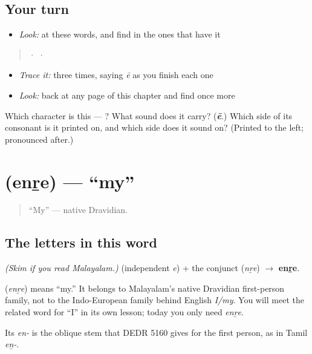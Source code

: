 \subsection*{Your turn}
\begin{itemize}
\raggedright
  \item \emph{Look:} at these words, and find  in the ones that have it
\end{itemize}

\begin{quote}
  ·    ·  
\end{quote}

\begin{itemize}
\raggedright
  \item \emph{Trace it:}  three times, saying \emph{ē} as you finish each one
  \item \emph{Look:} back at any page of this chapter and find  once more
\end{itemize}

\begin{tcolorbox}[breakable,colback=teal!4,colframe=teal!35!black,title={Before you move on}]
Which character is this — ? What sound does it carry? (\emph{\textbf{ē}}.) Which side of its consonant is it printed on, and which side does it sound on? (Printed to the left; pronounced after.)
\end{tcolorbox}
\section[\texorpdfstring{\ml{എന്റെ} (enṟe)}{എന്റെ (enṟe)}]{ (enṟe) — \textquotedblleft{}my\textquotedblright{}}

\label{lesson:ML-C02-enre}



\begin{quote}
\textquotedblleft{}My\textquotedblright{} — native Dravidian.
\end{quote}

\subsection*{The letters in this word}
\emph{(Skim if you read Malayalam.)} \textbf{} (independent \emph{e}) + the conjunct \textbf{} (\emph{nṟe}) $\to$ \textbf{enṟe}.

\begin{cousinweb}
\textbf{} (\emph{enṟe}) means \textquotedblleft{}my.\textquotedblright{} It belongs to Malayalam's native Dravidian first-person family, not to the Indo-European family behind English \emph{I/my}. You will meet the related word for \textquotedblleft{}I\textquotedblright{} in its own lesson; today you only need \emph{enṟe}.

Its \emph{en-} is the oblique stem that DEDR 5160 gives for the first person, as in Tamil \emph{eṉ-}.
\end{cousinweb}

